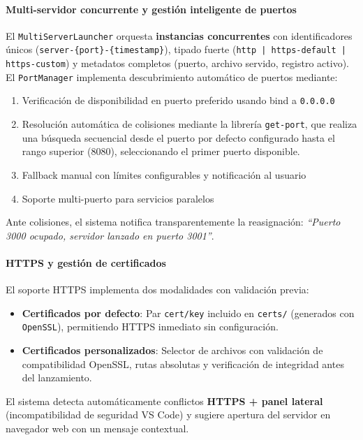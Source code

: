 \documentclass[a4paper, 12pt]{book}
\begin{document}
\paragraph{Multi-servidor concurrente y gestión inteligente de puertos}
El \texttt{MultiServerLauncher} orquesta \textbf{instancias concurrentes} con identificadores únicos (\texttt{server-\{port\}-\{timestamp\}}), tipado fuerte (\texttt{http | https-default | https-custom}) y metadatos completos (puerto, archivo servido, registro activo). El \texttt{PortManager} implementa descubrimiento automático de puertos mediante:

\begin{enumerate}
  \item Verificación de disponibilidad en puerto preferido usando bind a \texttt{0.0.0.0}
\item Resolución automática de colisiones mediante la librería \texttt{get-port}\cite{get-port}, que realiza una búsqueda secuencial desde el puerto por defecto configurado hasta el rango superior (8080), seleccionando el primer puerto disponible.
  \item Fallback manual con límites configurables y notificación al usuario
  \item Soporte multi-puerto para servicios paralelos
\end{enumerate}

Ante colisiones, el sistema notifica transparentemente la reasignación: \emph{``Puerto 3000 ocupado, servidor lanzado en puerto 3001''}.

\paragraph{HTTPS y gestión de certificados}
El soporte HTTPS implementa dos modalidades con validación previa:

\begin{itemize}
  \item \textbf{Certificados por defecto}: Par \texttt{cert/key} incluido en \texttt{certs/} (generados con \texttt{OpenSSL}\cite{openssl}), permitiendo HTTPS inmediato sin configuración.
  \item \textbf{Certificados personalizados}: Selector de archivos con validación de compatibilidad OpenSSL, rutas absolutas y verificación de integridad antes del lanzamiento.
\end{itemize}

El sistema detecta automáticamente conflictos \textbf{HTTPS + panel lateral} (incompatibilidad de seguridad VS Code) y sugiere apertura del servidor en navegador web con un mensaje contextual.
\end{document}
